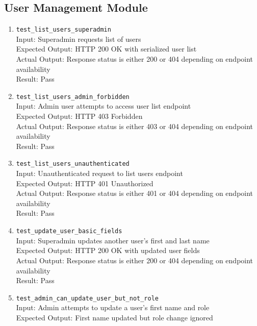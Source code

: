 \documentclass[12pt, titlepage]{article}
\begin{document}
\subsection{User Management Module}
  \begin{enumerate}
    \item \texttt{test\_list\_users\_superadmin} \label{test-list-users-superadmin}
    \\Input: Superadmin requests list of users
    \\Expected Output: HTTP 200 OK with serialized user list
    \\Actual Output: Response status is either 200 or 404 depending on endpoint availability
    \\Result: Pass
    \item \texttt{test\_list\_users\_admin\_forbidden} \label{test-list-users-admin-forbidden}
    \\Input: Admin user attempts to access user list endpoint
    \\Expected Output: HTTP 403 Forbidden
    \\Actual Output: Response status is either 403 or 404 depending on endpoint availability
    \\Result: Pass
    \item \texttt{test\_list\_users\_unauthenticated} \label{test-list-users-unauthenticated}
    \\Input: Unauthenticated request to list users endpoint
    \\Expected Output: HTTP 401 Unauthorized
    \\Actual Output: Response status is either 401 or 404 depending on endpoint availability
    \\Result: Pass
    \item \texttt{test\_update\_user\_basic\_fields} \label{test-update-user-basic-fields}
    \\Input: Superadmin updates another user's first and last name
    \\Expected Output: HTTP 200 OK with updated user fields
    \\Actual Output: Response status is either 200 or 404 depending on endpoint availability
    \\Result: Pass
    \item \texttt{test\_admin\_can\_update\_user\_but\_not\_role} \label{test-admin-update-no-role}
    \\Input: Admin attempts to update a user's first name and role
    \\Expected Output: First name updated but role change ignored

\end{enumerate}
\end{document}

